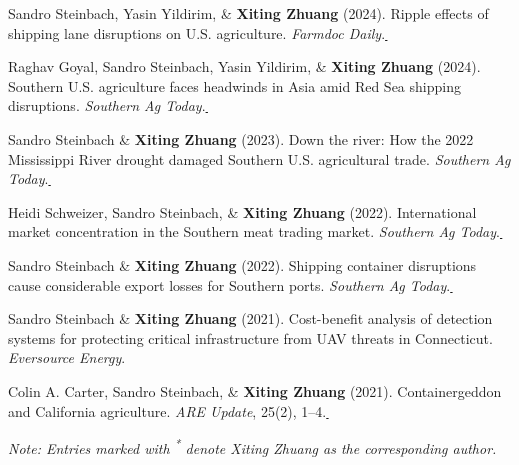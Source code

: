 \documentclass[10.8 pt,letterpaper]{article}
\newcommand{\paperlink}[1]{\href{#1}{\,\small\faExternalLink}}
\renewenvironment{itemize}{
	\begin{list}{}{
			\setlength{\leftmargin}{1.5em}
		}
	}{
	\end{list}
}
\begin{document}
\begin{itemize}
		\item[-] Sandro Steinbach, Yasin Yildirim, \& \textbf{Xiting Zhuang} (2024). Ripple effects of shipping lane disruptions on U.S. agriculture. \textit{Farmdoc Daily}.\paperlink{https://farmdocdaily.illinois.edu/2024/01/ripple-effects-of-shipping-lane-disruptions-on-u-s-agriculture.html}
		
		\item[-] Raghav Goyal, Sandro Steinbach, Yasin Yildirim, \& \textbf{Xiting Zhuang} (2024). Southern U.S. agriculture faces headwinds in Asia amid Red Sea shipping disruptions. \textit{Southern Ag Today}.\paperlink{https://southernagtoday.org/2024/02/01/southern-u-s-agriculture-faces-headwinds-in-asia-amid-red-sea-shipping-disruptions/}
		
		\item[-] Sandro Steinbach \& \textbf{Xiting Zhuang} (2023). Down the river: How the 2022 Mississippi River drought damaged Southern U.S. agricultural trade. \textit{Southern Ag Today}.\paperlink{https://southernagtoday.org/2023/05/04/down-the-river-how-the-2022-mississippi-river-drought-damaged/}
		\item[-] Heidi Schweizer, Sandro Steinbach, \& \textbf{Xiting Zhuang} (2022). International market concentration in the Southern meat trading market. \textit{Southern Ag Today}.\paperlink{https://southernagtoday.org/2022/07/14/international-market-concentration-in-the-southern-meat-trading-market/}
		
		\item[-] Sandro Steinbach \& \textbf{Xiting Zhuang} (2022). Shipping container disruptions cause considerable export losses for Southern ports. \textit{Southern Ag Today}.\paperlink{https://southernagtoday.org/2022/04/shipping-container-disruptions-cause-considerable-export-losses-for-southern-ports/}
		
		\item[-] Sandro Steinbach \& \textbf{Xiting Zhuang} (2021). Cost-benefit analysis of detection systems for protecting critical infrastructure from UAV threats in Connecticut. \textit{Eversource Energy}.
		\item[-] Colin A. Carter, Sandro Steinbach, \& \textbf{Xiting Zhuang} (2021). Containergeddon and California agriculture. \textit{ARE Update}, 25(2), 1--4.\paperlink{https://giannini.ucop.edu/publications/are-update/issues/2021/25/2/containergeddon-and-california-agriculture/}
	\end{itemize}
	
	
	\begin{footnotesize}
		\textit{Note: Entries marked with \textsuperscript{*} denote Xiting Zhuang as the corresponding author.}
	\end{footnotesize}
	
\end{document}
